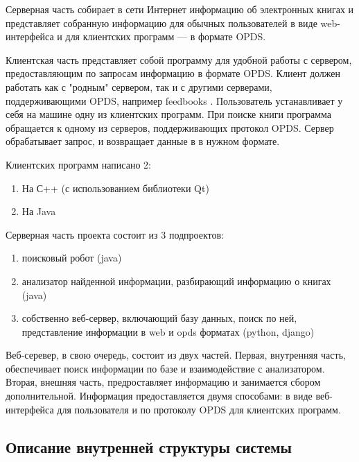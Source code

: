 Серверная часть собирает в сети Интернет информацию об электронных книгах и представляет собранную информацию для обычных пользователей в виде web-интерфейса и для клиентских программ --- в формате OPDS.

Клиентская часть представляет собой программу для удобной работы с сервером, предоставляющим по запросам информацию в формате OPDS. Клиент должен работать как с "родным" сервером, так и с другими серверами, поддерживающими OPDS, например feedbooks \cite{feedbooks}.
Пользователь устанавливает у себя на машине одну из клиентских программ. При поиске книги программа обращается к одному из серверов, поддерживающих протокол OPDS. Сервер обрабатывает запрос, и возвращает данные в в нужном формате. 

Клиентских программ написано 2:
\begin{enumerate}
	\item На С++ (с использованием библиотеки Qt)
	\item На Java
\end{enumerate}

Серверная часть проекта состоит из 3 подпроектов:
\begin{enumerate}
	\item поисковый робот (java)
	\item анализатор найденной информации, разбирающий информацию о книгах (java) 
	\item собственно веб-сервер, включающий базу данных, поиск по ней, представление информации в web и opds форматах (python, django)
\end{enumerate}

Веб-серевер, в свою очередь, состоит из двух частей. Первая, внутренняя часть, обеспечивает поиск информации по базе и взаимодействие с анализатором.
Вторая, внешняя часть, предроставляет информацию и занимается сбором дополнительной. Информация предоставляется двумя способами: в виде веб-интерфейса для пользователя и по протоколу OPDS для клиентских программ.


		
\subsection{Описание внутренней структуры системы}

